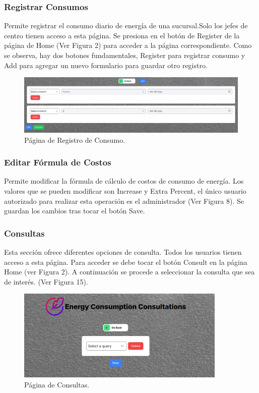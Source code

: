 \documentclass{article}
\begin{document}
\subsubsection{Registrar Consumos}
Permite registrar el consumo diario de energía de una sucursal.Solo los jefes de centro tienen acceso a esta página. Se presiona en el botón de Register de la página de Home (Ver Figura 2) para acceder a la página correspondiente.
Como se observa, hay dos botones fundamentales, Register para registrar consumo y Add para agregar un nuevo formulario para guardar otro registro.
\begin{figure}[h!]
    \centering
    \includegraphics[width= 14cm]{register_consume.png}
    \caption{Página de Registro de Consumo.}
\end{figure}

\subsubsection{Editar Fórmula de Costos}
Permite modificar la fórmula de cálculo de costos de consumo de energía. Los valores que se pueden modificar son Increase y Extra Percent, el único usuario autorizado para 
realizar esta operación es el administrador (Ver Figura 8). Se guardan los cambios tras tocar el botón Save.

\subsubsection{Consultas}
Esta sección ofrece diferentes opciones de consulta. Todos los usuarios tienen acceso a esta página. Para acceder se debe tocar el botón Consult en la página 
Home (ver Figura 2). A continuación se procede a seleccionar la consulta que sea de interés. (Ver Figura 15).

\begin{figure}[h!]
    \centering
    \includegraphics[width= 10cm]{consult_page.png}
    \caption{Página de Consultas.}
\end{figure}
\end{document}
